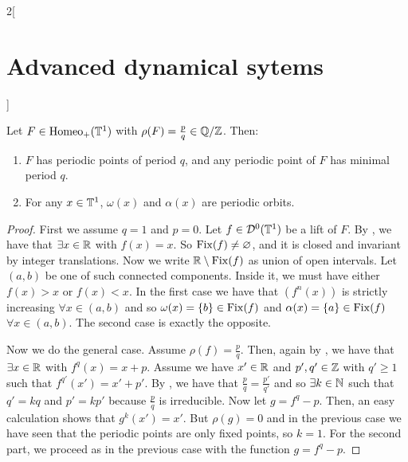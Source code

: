\documentclass[../../../main_math.tex]{subfiles}
\begin{document}
\begin{multicols}{2}[\section{Advanced dynamical sytems}]
\begin{theorem}
    Let $F\in \mathrm{Homeo}_+(\mathbb{T}^1)$ with $\rho(F)=\frac{p}{q}\in \quot{\QQ}{\ZZ}$. Then:
    \begin{enumerate}
      \item $F$ has periodic points of period $q$, and any periodic point of $F$ has minimal period $q$.
      \item For any $x\in \mathbb{T}^1$, $\omega(x)$ and $\alpha(x)$ are periodic orbits.
    \end{enumerate}
  \end{theorem}
  \begin{proof}
    First we assume $q=1$ and $p=0$. Let $f\in \mathcal{D}^0(\mathbb{T}^1)$ be a lift of $F$. By , we have that $\exists x\in \mathbb{R}$ with $f(x)=x$. So $\mathrm{Fix}(f)\ne \varnothing$, and it is closed and invariant by integer translations. Now we write $\mathbb{R}\setminus\mathrm{Fix}(f)$ as union of open intervals. Let $(a,b)$ be one of such connected components. Inside it, we must have either $f(x)>x$ or $f(x)<x$. In the first case we have that $(f^n(x))$ is strictly increasing $\forall x\in (a,b)$ and so $\omega(x)=\{b\}\in\mathrm{Fix}(f)$ and $\alpha(x)=\{a\}\in\mathrm{Fix}(f)$ $\forall x\in(a,b)$. The second case is exactly the opposite.

    Now we do the general case. Assume $\rho(f)=\frac{p}{q}$. Then, again by , we have that $\exists x\in \mathbb{R}$ with $f^q(x)=x+p$. Assume we have $x'\in\mathbb{R}$ and $p',q'\in\mathbb{Z}$ with $q'\geq 1$ such that $f^{q'}(x')=x'+p'$. By , we have that $\frac{p}{q}=\frac{p'}{q'}$ and so $\exists k\in\mathbb{N}$ such that $q'=kq$ and $p'=kp'$ because $\frac{p}{q}$ is irreducible. Now let $g=f^q-p$. Then, an easy calculation shows that $g^k(x')=x'$. But $\rho(g)=0$ and in the previous case we have seen that the periodic points are only fixed points, so $k=1$. For the second part, we proceed as in the previous case with the function $g=f^q-p$.
  \end{proof}

\end{multicols}
\end{document}
